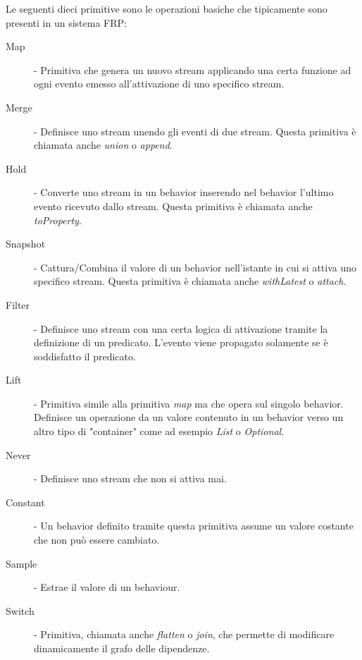 \documentclass[../main.tex]{subfiles}
\begin{document}
Le seguenti dieci primitive sono le operazioni basiche che tipicamente sono presenti in un sistema FRP:
\begin{description}
    \item[Map] - Primitiva che genera un nuovo stream applicando una certa funzione ad ogni evento emesso all'attivazione di uno specifico stream.
    \item[Merge] - Definisce uno stream unendo gli eventi di due stream. Questa primitiva è chiamata anche \textit{union} o \textit{append}.
    \item[Hold] - Converte uno stream in un behavior inserendo nel behavior l'ultimo evento ricevuto dallo stream. Questa primitiva è chiamata anche \textit{toProperty}.
    \item[Snapshot] - Cattura/Combina il valore di un behavior nell'istante in cui si attiva uno specifico stream. Questa primitiva è chiamata anche \textit{withLatest} o \textit{attach}.
    \item[Filter] - Definisce uno stream con una certa logica di attivazione tramite la definizione di un predicato. L'evento viene propagato solamente se è soddisfatto il predicato.
    \item[Lift] - Primitiva simile alla primitiva \textit{map} ma che opera sul singolo behavior. Definisce un operazione da un valore contenuto in un behavior verso un altro tipo di "container" come ad esempio \textit{List} o \textit{Optional}.
    \item[Never] - Definisce uno stream che non si attiva mai.
    \item[Constant] - Un behavior definito tramite questa primitiva assume un valore costante che non può essere cambiato.
    \item[Sample] - Estrae il valore di un behaviour.
    \item[Switch] - Primitiva, chiamata anche \textit{flatten} o \textit{join}, che permette di modificare dinamicamente il grafo delle dipendenze.
\end{description}
\end{document}
